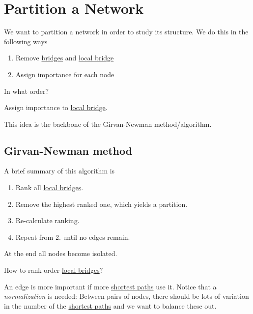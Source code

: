 \chapter{Partition a Network}
We want to partition a network in order to study its structure. We do this in the following ways
\begin{enumerate}
	\item Remove \hyperref[def:bridge]{bridges} and \hyperref[def:local-bridge]{local bridge}
	\item Assign importance for each node
\end{enumerate}

\begin{problem}
In what order?
\end{problem}
\begin{answer}
	Assign importance to \hyperref[def:local-bridge]{local bridge}.
\end{answer}

This idea is the backbone of the Girvan-Newman method/algorithm.

\section{Girvan-Newman method}
\begin{intuition}
	A brief summary of this algorithm is
	\begin{enumerate}
		\item Rank all \hyperref[def:local-bridge]{local bridges}.
		\item Remove the highest ranked one, which yields a partition.
		\item Re-calculate ranking.
		\item Repeat from 2. until no edges remain.
	\end{enumerate}
\end{intuition}

\begin{note}
	At the end all nodes become isolated.
\end{note}

\begin{problem}
How to rank order \hyperref[def:local-bridge]{local bridges}?
\end{problem}

\begin{intuition}
	An edge is more important if more \hyperref[def:shortest-path]{shortest paths} use it. Notice that a \emph{normalization} is needed:
	Between pairs of nodes, there should be lots of variation in the number of the \hyperref[def:shortest-path]{shortest paths} and we want to balance these out.
\end{intuition}

